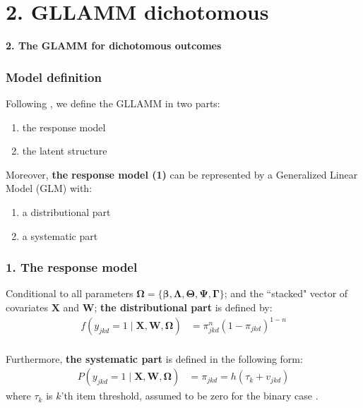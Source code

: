 \documentclass[nonav,sleutel]{beamer}
\begin{document}
	\section{2. GLLAMM dichotomous}
	\begin{frame}
		\LARGE{\textbf{2. The GLAMM for dichotomous outcomes}}
	\end{frame}
	\begin{frame}
		\frametitle{Model definition}
		Following \citet{Rabe_et_al_2004a, Rabe_et_al_2004b}, we define the GLLAMM in two parts: 
		\begin{enumerate}
			\item the response model
			\item the latent structure
		\end{enumerate}
		\vspace{0.3cm} Moreover, \textbf{the response model (1)} can be represented by 
		a Generalized Linear Model (GLM) \cite{Nelder_et_al_1972, Nelder_et_al_1989} with:
		\begin{enumerate}
			\item a distributional part
			\item a systematic part
		\end{enumerate}
	\end{frame}
	\begin{frame}
		\frametitle{1. The response model}
		Conditional to all parameters $\pmb{\Omega} = \{ \pmb{\beta}, \pmb{\Lambda}, \pmb{\Theta}, \pmb{\Psi}, \pmb{\Gamma} \}$; and the ``stacked" vector of covariates $\mathbf{X}$ and $\mathbf{W}$; \textbf{the distributional part} is defined by:
		\begin{equation} \label{eq:distributional}
			\begin{split}
				f \left( y_{jkd}=1 \; | \; \mathbf{X}, \mathbf{W}, \pmb{\Omega} \right) &= \pi_{jkd}^{n} (1 - \pi_{jkd})^{1-n}
			\end{split}
		\end{equation} \\
		\vspace{0.3cm} Furthermore, \textbf{the systematic part} is defined in the following form:
		\begin{equation} \label{eq:systematic}
			\begin{split}
				P\left( y_{jkd}=1 \; | \; \mathbf{X}, \mathbf{W}, \pmb{\Omega} \right) &= \pi_{jkd} = h( \tau_{k} + v_{jkd} )
			\end{split}	
		\end{equation}
		where $\tau_{k}$ is $k$'th item threshold, assumed to be zero for the binary case \cite{Rabe_et_al_2004a}.
	\end{frame}
\end{document}
